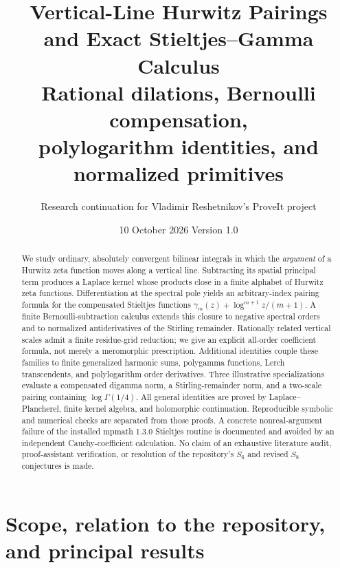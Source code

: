 \documentclass[11pt,a4paper]{article}
\title{\vspace{-12mm}\textbf{Vertical-Line Hurwitz Pairings\\and Exact Stieltjes--Gamma Calculus}\\[3mm]
\large Rational dilations, Bernoulli compensation,\\polylogarithm identities, and normalized primitives}
\author{Research continuation for Vladimir Reshetnikov's ProveIt project}
\date{10 October 2026 \quad\textbullet\quad Version 1.0}
\theoremstyle{definition}
\numberwithin{equation}{section}
\begin{document}
\maketitle
\begin{abstract}
We study ordinary, absolutely convergent bilinear integrals in which the
\emph{argument} of a Hurwitz zeta function moves along a vertical line.
Subtracting its spatial principal term produces a Laplace kernel whose
products close in a finite alphabet of Hurwitz zeta functions. Differentiation
at the spectral pole yields an arbitrary-index pairing formula for the
compensated Stieltjes functions
$\gamma_m(z)+\log^{m+1}z/(m+1)$. A finite Bernoulli-subtraction calculus extends
this closure to negative spectral orders and to normalized antiderivatives
of the Stirling remainder. Rationally related vertical scales admit a finite
residue-grid reduction; we give an explicit all-order coefficient formula,
not merely a meromorphic prescription. Additional identities couple these
families to finite generalized harmonic sums, polygamma functions, Lerch
transcendents, and polylogarithm order derivatives. Three illustrative
specializations evaluate a compensated digamma norm, a Stirling-remainder
norm, and a two-scale pairing containing $\log\Gamma(1/4)$.
All general identities are proved by Laplace--Plancherel, finite kernel
algebra, and holomorphic continuation. Reproducible symbolic and numerical
checks are separated from those proofs. A concrete nonreal-argument failure
of the installed mpmath 1.3.0 Stieltjes routine is documented and avoided by
an independent Cauchy-coefficient calculation. No claim of an exhaustive
literature audit, proof-assistant verification, or resolution of the
repository's $S_6$ and revised $S_8$ conjectures is made.
\end{abstract}
\tableofcontents
\clearpage
\section{Scope, relation to the repository, and principal results}
\label{sec:scope}
\end{document}
